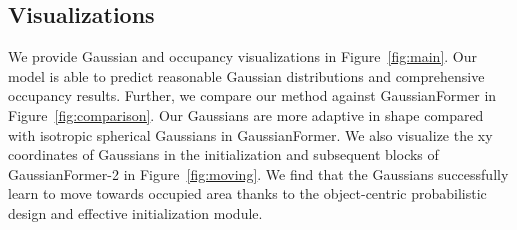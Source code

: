 \subsection{Visualizations}
We provide Gaussian and occupancy visualizations in Figure~\ref{fig:main}. 
Our model is able to predict reasonable Gaussian distributions and comprehensive occupancy results.
Further, we compare our method against GaussianFormer in Figure~\ref{fig:comparison}.
Our Gaussians are more adaptive in shape compared with isotropic spherical Gaussians in GaussianFormer.
We also visualize the xy coordinates of Gaussians in the initialization and subsequent blocks of GaussianFormer-2 in Figure~\ref{fig:moving}.
We find that the Gaussians successfully learn to move towards occupied area thanks to the object-centric probabilistic design and effective initialization module.


